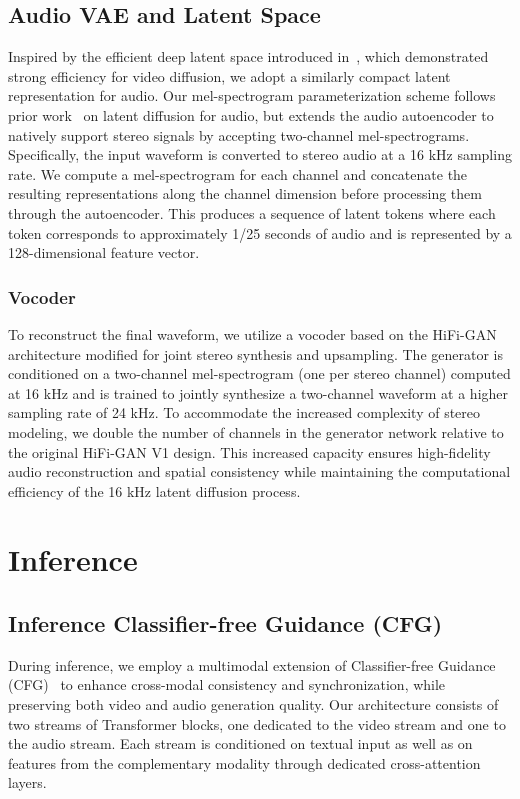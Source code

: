\documentclass{article}
\begin{document}
\subsection{Audio VAE and Latent Space}
Inspired by the efficient deep latent space introduced in~\cite{hacohen2024ltx}, which demonstrated strong efficiency for video diffusion, we adopt a similarly compact latent representation for audio. Our mel-spectrogram parameterization scheme follows prior work~\cite{liu2023audioldm, audioldm2-2024taslp} on latent diffusion for audio, but extends the audio autoencoder to natively support stereo signals by accepting two-channel mel-spectrograms. Specifically, the input waveform is converted to stereo audio at a 16 kHz sampling rate. We compute a mel-spectrogram for each channel and concatenate the resulting representations along the channel dimension before processing them through the autoencoder. This produces a sequence of latent tokens where each token corresponds to approximately 1/25 seconds of audio and is represented by a 128-dimensional feature vector.

\subsubsection{Vocoder} To reconstruct the final waveform, we utilize a vocoder based on the HiFi-GAN~\cite{kong2020hifi} architecture modified for joint stereo synthesis and upsampling. The generator is conditioned on a two-channel mel-spectrogram (one per stereo channel) computed at 16 kHz and is trained to jointly synthesize a two-channel waveform at a higher sampling rate of 24 kHz. To accommodate the increased complexity of stereo modeling, we double the number of channels in the generator network relative to the original HiFi-GAN V1 design. This increased capacity ensures high-fidelity audio reconstruction and spatial consistency while maintaining the computational efficiency of the 16 kHz latent diffusion process.

\section{Inference}

\subsection{Inference Classifier-free Guidance (CFG)}

During inference, we employ a multimodal extension of Classifier-free Guidance (CFG)~\cite{ho2022classifier} to enhance cross-modal consistency and synchronization, while preserving both video and audio generation quality.  
Our architecture consists of two streams of Transformer blocks, one dedicated to the video stream and one to the audio stream. Each stream is conditioned on textual input as well as on features from the complementary modality through dedicated cross-attention layers.
\end{document}

